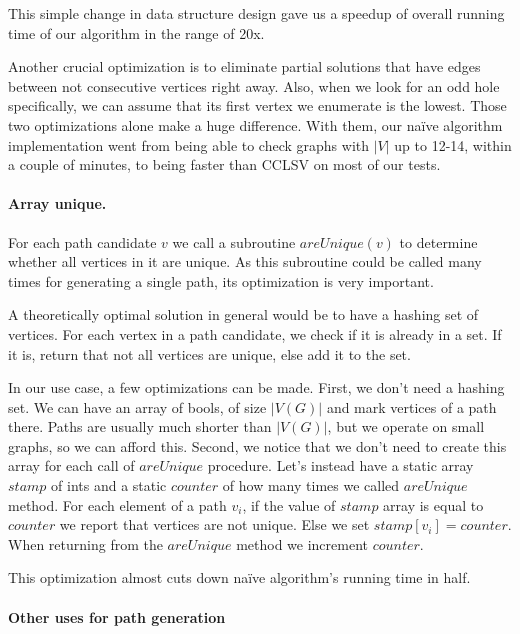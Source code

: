 This simple change in data structure design gave us a speedup of overall running time of our algorithm in the range of 20x.

Another crucial optimization is to eliminate partial solutions that have edges between not consecutive vertices right away. Also, when we look for an odd hole specifically, we can assume that its first vertex we enumerate is the lowest. Those two optimizations alone make a huge difference. With them, our na\"ive algorithm implementation went from being able to check graphs with $|V|$ up to 12-14, within a couple of minutes, to being faster than CCLSV on most of our tests.

\paragraph{Array unique.}

For each path candidate $v$ we call a subroutine $areUnique(v)$ to determine whether all vertices in it are unique. As this subroutine could be called many times for generating a single path, its optimization is very important.

A theoretically optimal solution in general would be to have a hashing set of vertices. For each vertex in a path candidate, we check if it is already in a set. If it is, return that not all vertices are unique, else add it to the set.

In our use case, a few optimizations can be made. First, we don't need a hashing set. We can have an array of bools, of size $|V(G)|$ and mark vertices of a path there. Paths are usually much shorter than $|V(G)|$, but we operate on small graphs, so we can afford this. Second, we notice that we don't need to create this array for each call of $areUnique$ procedure. Let's instead have a static array $stamp$ of ints and a static $counter$ of how many times we called $areUnique$ method. For each element of a path $v_i$, if the value of $stamp$ array is equal to $counter$ we report that vertices are not unique. Else we set $stamp[v_i] = counter$. When returning from the $areUnique$ method we increment $counter$.

This optimization almost cuts down na\"ive algorithm's running time in half.

\paragraph{Other uses for path generation}
\label{sec:usesGeneration}

